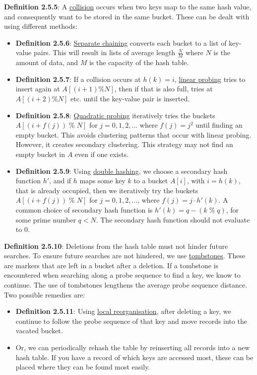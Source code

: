 \documentclass{article}
\newcommand{\separate}[1] {\vspace{#1 pt}\noindent}
\newcommand{\definition}[2]{\textbf{Definition #1}: #2\label{def:#1}}
\begin{document}
\separate{7}\definition{2.5.5}{A \underline{collision} occurs when two keys map to the same hash value, and consequently want to be stored in the same bucket. These can be dealt with using different methods:}
\begin{itemize}
    \item \definition{2.5.6}{\underline{Separate chaining} converts each bucket to a list of key-value pairs. This will result in lists of average length \(\frac{N}{M}\) where \(N\) is the amount of data, and \(M\) is the capacity of the hash table.}
    \item \definition{2.5.7}{If a collision occurs at \(h(k)=i\), \underline{linear probing} tries to insert again at \(A[(i+1)\%N]\), then if that is also full, tries at \(A[(i+2)\%N]\) etc. until the key-value pair is inserted.}
    \item \definition{2.5.8}{\underline{Quadratic probing} iteratively tries the buckets \(A[(i+f(j)) \; \% \; N]\) for \(j=0,1,2,...\) where \(f(j)=j^2\) until finding an empty bucket. This avoids clustering patterns that occur with linear probing. However, it creates secondary clustering. This strategy may not find an empty bucket in $A$ even if one exists.}
    \item \definition{2.5.9}{Using \underline{double hashing}, we choose a secondary hash function $h'$, and if $h$ maps some key $k$ to a bucket $A[i]$, with $i=h(k)$, that is already occupied, then we iteratively try the buckets $A[(i+f(j)) \; \% \; N]$ for $j=0,1,2,...$, where $f(j)=j \cdot h'(k)$. A common choice of secondary hash function is $h'(k)=q-(k \; \% \; q)$, for some prime number $q<N$. The secondary hash function should not evaluate to 0. }
\end{itemize}
\definition{2.5.10}{Deletions from the hash table must not hinder future searches. To ensure future searches are not hindered, we use \underline{tombstones}. These are markers that are left in a bucket after a deletion. If a tombstone is encountered when searching along a probe sequence to find a key, we know to continue. The use of tombstones lengthens the average probe sequence distance. Two possible remedies are:}
\begin{itemize}
    \item \definition{2.5.11}{Using \underline{local reorganisation}, after deleting a key, we continue to follow the probe sequence of that key and move records into the vacated bucket.} 
    \item Or, we can periodically rehash the table by reinserting all records into a new hash table. If you have a record of which keys are accessed most, these can be placed where they can be found most easily. 
\end{itemize}
\end{document}
